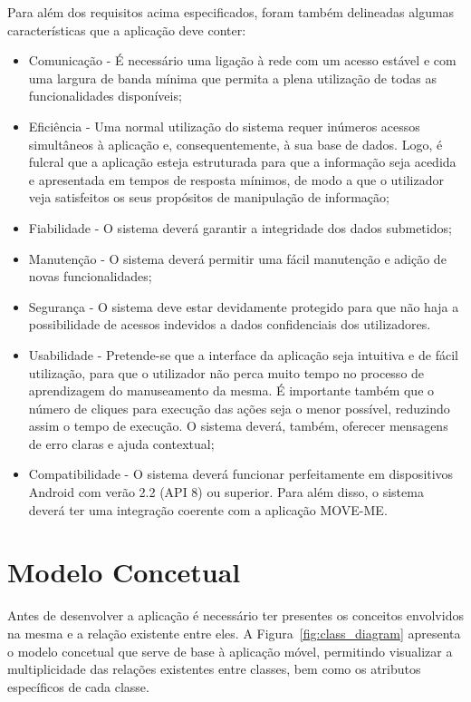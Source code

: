 Para além dos requisitos acima especificados, foram também delineadas algumas características que a aplicação deve conter:
\begin{itemize}
\item Comunicação - É necessário uma ligação à rede com um acesso estável e com uma largura de banda mínima que permita a plena utilização de todas as funcionalidades disponíveis;
\item Eficiência - Uma normal utilização do sistema requer inúmeros acessos simultâneos à aplicação e, consequentemente, à sua base de dados. Logo, é fulcral que a aplicação esteja estruturada para que a informação seja acedida e apresentada em tempos de resposta mínimos, de modo a que o utilizador veja satisfeitos os seus propósitos de manipulação de informação;
\item Fiabilidade - O sistema deverá garantir a integridade dos dados submetidos;
\item Manutenção - O sistema deverá permitir uma fácil manutenção e adição de novas funcionalidades;
\item Segurança - O sistema deve estar devidamente protegido para que não haja a possibilidade de acessos indevidos a dados confidenciais dos utilizadores.
\item Usabilidade - Pretende-se que a interface da aplicação seja intuitiva e de fácil utilização, para que o utilizador não perca muito tempo no processo de aprendizagem do manuseamento da mesma. É importante também que o número de cliques para execução das ações seja o menor possível, reduzindo assim o tempo de execução. O sistema deverá, também, oferecer mensagens de erro claras e ajuda contextual;
\item Compatibilidade - O sistema deverá funcionar perfeitamente em dispositivos Android com verão 2.2 (API 8) ou superior. Para além disso, o sistema deverá ter uma integração coerente com a aplicação MOVE-ME.

\end{itemize}

\section{Modelo Concetual}

Antes de desenvolver a aplicação é necessário ter presentes os conceitos envolvidos na mesma e a relação existente entre eles. A Figura~\ref{fig:class_diagram} apresenta o modelo concetual que serve de base à aplicação móvel, permitindo visualizar a multiplicidade das relações existentes entre classes, bem como os atributos específicos de cada classe.


